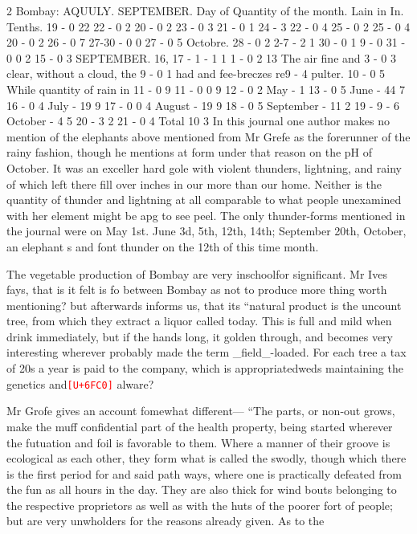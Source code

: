 \documentclass[10pt]{article}
\newcommand{\unk}[1]{\textcolor{red}{\texttt{\scriptsize[U+#1]}}}
\begin{document}
\begin{multicols}{2}\raggedcolumns
Bombay: AQUULY. SEPTEMBER. Day of Quantity of the month. Lain in In. Tenths. 19 - 0 22 22 - 0 2 20 - 0 2 23 - 0 3 21 - 0 1 24 - 3 22 - 0 4 25 - 0 2 25 - 0 4 20 - 0 2 26 - 0 7 27-30 - 0 0 27 - 0 5 Octobre. 28 - 0 2 2-7 - 2 1 30 - 0 1 9 - 0 31 - 0 0 2 15 - 0 3 SEPTEMBER. 16, 17 - 1 - 1 1 1 - 0 2 13 The air fine and 3 - 0 3 clear, without a cloud, the 9 - 0 1 had and fee-breczes re9 - 4 pulter. 10 - 0 5 While quantity of rain in 11 - 0 9 11 - 0 0 9 12 - 0 2 May - 1 13 - 0 5 June - 44 7 16 - 0 4 July - 19 9 17 - 0 0 4 August - 19 9 18 - 0 5 September - 11 2 19 - 9 - 6 October - 4 5 20 - 3 2 21 - 0 4 Total 10 3 In this journal one author makes no mention of the elephants above mentioned from Mr Grefe as the forerunner of the rainy fashion, though he mentions at form under that reason on the pH of October. It was an exceller hard gole with violent thunders, lightning, and rainy of which left there fill over inches in our more than our home. Neither is the quantity of thunder and lightning at all comparable to what people unexamined with her element might be apg to see peel. The only thunder-forms mentioned in the journal were on May 1st. June 3d, 5th, 12th, 14th; September 20th, October, an elephant s and font thunder on the 12th of this time month.

The vegetable production of Bombay are very inschoolfor significant. Mr Ives fays, that is it felt is fo between Bombay as not to produce more thing worth mentioning? but afterwards informs us, that its “natural product is the uncount tree, from which they extract a liquor called today. This is full and mild when drink immediately, but if the hands long, it golden through, and becomes very interesting wherever probably made the term \_field\_-loaded. For each tree a tax of 20s a year is paid to the company, which is appropriatedweds maintaining the genetics and\unk{6FC0} alware?

Mr Grofe gives an account fomewhat different— “The parts, or non-out grows, make the muff confidential part of the health property, being started wherever the futuation and foil is favorable to them. Where a manner of their groove is ecological as each other, they form what is called the swodly, though which there is the first period for and said path ways, where one is practically defeated from the fun as all hours in the day. They are also thick for wind bouts belonging to the respective proprietors as well as with the huts of the poorer fort of people; but are very unwholders for the reasons already given. As to the


\end{multicols}
\end{document}
